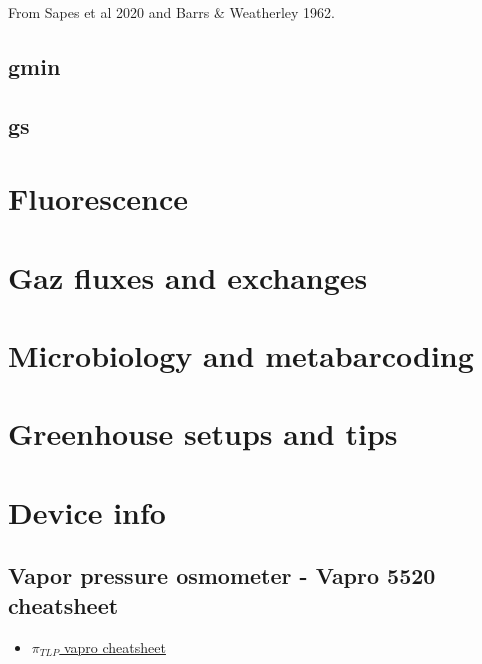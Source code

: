 \documentclass[
  12pt,
  american,
  a4paper,
  extrafontsizes,onecolumn,openright
  ]{memoir}
\providecommand{\tightlist}{%
  \setlength{\itemsep}{0pt}\setlength{\parskip}{0pt}}
\begin{document}
From Sapes et al 2020 and Barrs \& Weatherley 1962.

\hypertarget{gmin}{%
\section{gmin}\label{gmin}}

\hypertarget{gs}{%
\section{gs}\label{gs}}

\hypertarget{fluorescence-1}{%
\chapter{Fluorescence}\label{fluorescence-1}}

\hypertarget{gaz-fluxes-and-exchanges-1}{%
\chapter{Gaz fluxes and exchanges}\label{gaz-fluxes-and-exchanges-1}}

\hypertarget{microbiology-and-metabarcoding-1}{%
\chapter{Microbiology and metabarcoding}\label{microbiology-and-metabarcoding-1}}

\hypertarget{greenhouse-setups-and-tips-1}{%
\chapter{Greenhouse setups and tips}\label{greenhouse-setups-and-tips-1}}

\hypertarget{device-info-1}{%
\chapter{Device info}\label{device-info-1}}

\hypertarget{vapor-pressure-osmometer---vapro-5520-cheatsheet}{%
\section{Vapor pressure osmometer - Vapro 5520 cheatsheet}\label{vapor-pressure-osmometer---vapro-5520-cheatsheet}}

\begin{itemize}
\tightlist
\item
  \href{./document/machine/Vapro\%205520/Vapro_cheatsheet.pdf}{\textbf{\(\pi_{TLP}\)} vapro cheatsheet}
\end{itemize}
\end{document}

